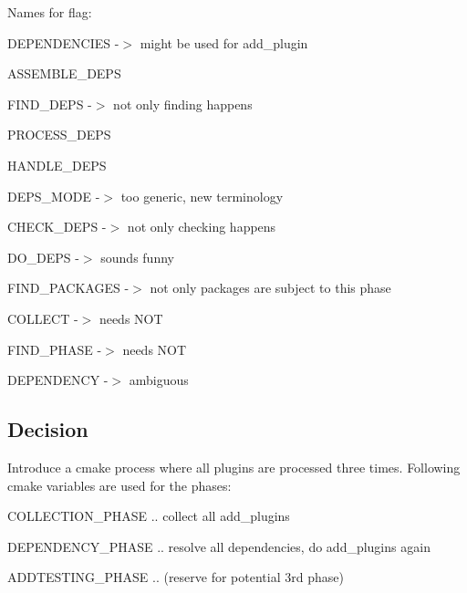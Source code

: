 Names for flag\+:


\begin{DoxyItemize}
\item {\ttfamily D\+E\+P\+E\+N\+D\+E\+N\+C\+I\+E\+S} -\/$>$ might be used for {\ttfamily add\+\_\+plugin}
\item {\ttfamily A\+S\+S\+E\+M\+B\+L\+E\+\_\+\+D\+E\+P\+S}
\item {\ttfamily F\+I\+N\+D\+\_\+\+D\+E\+P\+S} -\/$>$ not only finding happens
\item {\ttfamily P\+R\+O\+C\+E\+S\+S\+\_\+\+D\+E\+P\+S}
\item {\ttfamily H\+A\+N\+D\+L\+E\+\_\+\+D\+E\+P\+S}
\item {\ttfamily D\+E\+P\+S\+\_\+\+M\+O\+D\+E} -\/$>$ too generic, new terminology
\item {\ttfamily C\+H\+E\+C\+K\+\_\+\+D\+E\+P\+S} -\/$>$ not only checking happens
\item {\ttfamily D\+O\+\_\+\+D\+E\+P\+S} -\/$>$ sounds funny
\item {\ttfamily F\+I\+N\+D\+\_\+\+P\+A\+C\+K\+A\+G\+E\+S} -\/$>$ not only packages are subject to this phase
\item {\ttfamily C\+O\+L\+L\+E\+C\+T} -\/$>$ needs N\+O\+T
\item {\ttfamily F\+I\+N\+D\+\_\+\+P\+H\+A\+S\+E} -\/$>$ needs N\+O\+T
\item {\ttfamily D\+E\+P\+E\+N\+D\+E\+N\+C\+Y} -\/$>$ ambiguous
\end{DoxyItemize}

\subsection*{Decision}

Introduce a cmake process where all plugins are processed three times. Following cmake variables are used for the phases\+:


\begin{DoxyItemize}
\item {\ttfamily C\+O\+L\+L\+E\+C\+T\+I\+O\+N\+\_\+\+P\+H\+A\+S\+E} .. collect all {\ttfamily add\+\_\+plugins}
\item {\ttfamily D\+E\+P\+E\+N\+D\+E\+N\+C\+Y\+\_\+\+P\+H\+A\+S\+E} .. resolve all dependencies, do {\ttfamily add\+\_\+plugins} again
\item {\ttfamily A\+D\+D\+T\+E\+S\+T\+I\+N\+G\+\_\+\+P\+H\+A\+S\+E} .. (reserve for potential 3rd phase)
\end{DoxyItemize}

